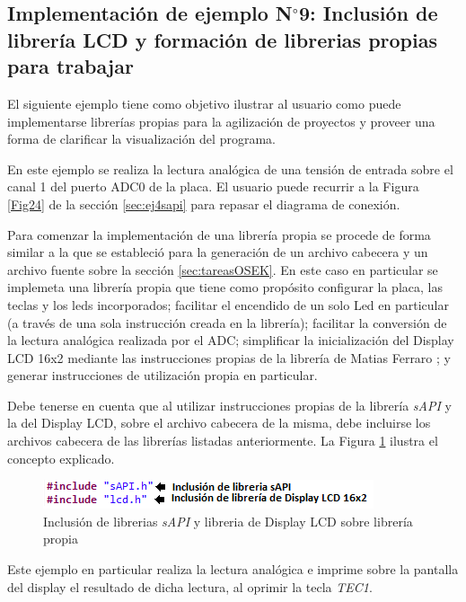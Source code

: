 \documentclass[12pt,letterpaper]{article}
\begin{document}
\subsection{Implementación de ejemplo N$^{\circ}$9: Inclusión de librería LCD y formación de librerias propias para trabajar}
El siguiente ejemplo tiene como objetivo ilustrar al usuario como puede implementarse librerías propias para la agilización de proyectos y proveer una forma de clarificar la visualización del programa.

En este ejemplo se realiza la lectura analógica de una tensión de entrada sobre el canal 1 del puerto ADC0 de la placa. El usuario puede recurrir a la Figura \ref{Fig24} de la sección \ref{sec:ej4sapi} para repasar el diagrama de conexión.

Para comenzar la implementación de una librería propia se procede de forma similar a la que se estableció para la generación de un archivo cabecera y un archivo fuente sobre la sección \ref{sec:tareasOSEK}. En este caso en particular se implemeta una librería propia que tiene como propósito configurar la placa, las teclas y los leds incorporados; facilitar el encendido de un solo Led en particular (a través de una sola instrucción creada en la librería); facilitar la conversión de la lectura analógica realizada por el ADC; simplificar la inicialización del Display LCD 16x2 mediante las instrucciones propias de la librería de Matias Ferraro \cite{repositoriomatiasferraro}; y generar instrucciones de utilización propia en particular.

Debe tenerse en cuenta que al utilizar instrucciones propias de la librería \textit{sAPI} y la del Display LCD, sobre el archivo cabecera de la misma, debe incluirse los archivos cabecera de las librerías listadas anteriormente. La Figura \ref{Fig47} ilustra el concepto explicado.

\begin{figure}[!h]
\centering
\includegraphics[width=8 cm]{figuras/f40.png}
\caption{Inclusión de librerias \textit{sAPI} y libreria de Display LCD sobre librería propia}
\label{Fig47}
\end{figure}

Este ejemplo en particular realiza la lectura analógica e imprime sobre la pantalla del display el resultado de dicha lectura, al oprimir la tecla \textit{TEC1}. 
\end{document}
